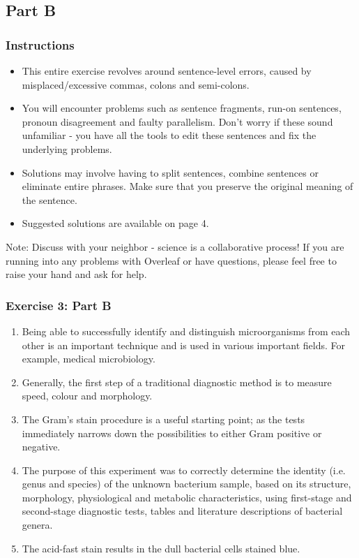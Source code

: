 \documentclass{article}
\begin{document}
\newpage
\subsection*{Part B}

\subsubsection*{Instructions}

\begin{itemize}
\item This entire exercise revolves around sentence-level errors, caused by misplaced/excessive commas, colons and semi-colons. 
\item You will encounter problems such as sentence fragments, run-on sentences, pronoun disagreement and faulty parallelism. Don't worry if these sound unfamiliar - you have all the tools to edit these sentences and fix the underlying problems.
\item Solutions may involve having to split sentences, combine sentences or eliminate entire phrases. Make sure that you preserve the original meaning of the sentence.
\item Suggested solutions are available on page 4. 
\end{itemize}

Note: Discuss with your neighbor - science is a collaborative process! If you are running into any problems with Overleaf or have questions, please feel free to raise your hand and ask for help. 

\subsubsection*{Exercise 3: Part B}

\begin{enumerate}
\item Being able to successfully identify and distinguish microorganisms from each other is an important technique and is used in various important fields. For example, medical microbiology.
\item Generally, the first step of a traditional diagnostic method is to measure speed, colour and morphology.
\item The Gram’s stain procedure is a useful starting point; as the tests immediately narrows down the possibilities to either Gram positive or negative. 
\item The purpose of this experiment was to correctly determine the identity (i.e. genus and species) of the unknown bacterium sample, based on its structure, morphology, physiological and metabolic characteristics, using first-stage and second-stage diagnostic tests, tables and literature descriptions of bacterial genera. 
\item The acid-fast stain results in the dull bacterial cells stained blue. 
\end{enumerate}
\end{document}
